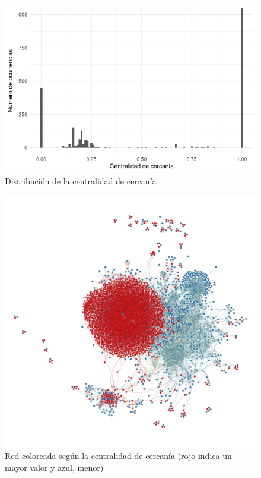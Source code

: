 \begin{figure}
    \centering
    \includegraphics[width=\textwidth]{images/plots/closeness-centrality.png}
    \caption{Distribución de la centralidad de cercanía}
    \label{fig:closeness-centrality-plot}
\end{figure}

\begin{figure}
    \centering
    \includegraphics[width=\textwidth]{images/graph/closeness-centrality.png}
    \caption{Red coloreada según la centralidad de cercanía (rojo indica un mayor valor y azul, menor)}
    \label{fig:closeness-centrality-graph}
\end{figure}

